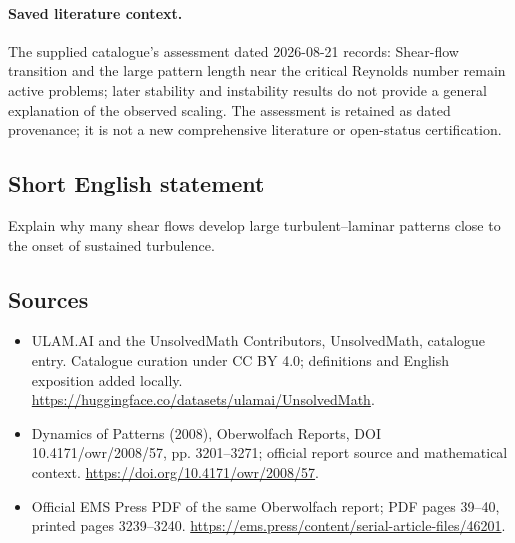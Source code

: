 \documentclass[11pt]{article}
\begin{document}
\paragraph{Saved literature context.} The supplied catalogue's assessment dated 2026-08-21 records: Shear-flow transition and the large pattern length near the critical Reynolds number remain active problems; later stability and instability results do not provide a general explanation of the observed scaling. The assessment is retained as dated provenance; it is not a new comprehensive literature or open-status certification.
\subsection{Short English statement}
Explain why many shear flows develop large turbulent--laminar patterns close to the onset of sustained turbulence.
\subsection{Sources}
\begin{itemize}
\item[\hypertarget{source:statement:1}{S1}] ULAM.AI and the UnsolvedMath Contributors, UnsolvedMath, catalogue entry. Catalogue curation under CC BY 4.0; definitions and English exposition added locally.
\url{https://huggingface.co/datasets/ulamai/UnsolvedMath}.
\item[\hypertarget{source:statement:2}{S2}] Dynamics of Patterns (2008), Oberwolfach Reports, DOI 10.4171/owr/2008/57, pp. 3201--3271; official report source and mathematical context.
\url{https://doi.org/10.4171/owr/2008/57}.
\item[\hypertarget{source:statement:3}{S3}] Official EMS Press PDF of the same Oberwolfach report; PDF pages 39--40, printed pages 3239--3240.
\url{https://ems.press/content/serial-article-files/46201}.
\end{itemize}
\label{end:statement}
\end{document}
